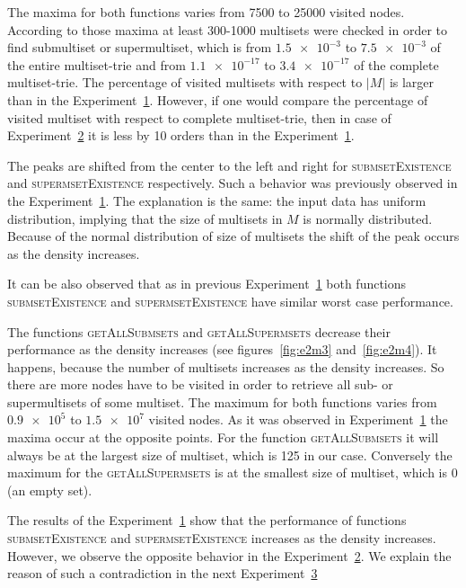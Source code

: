 The maxima for both functions varies from 7500 to 25000 visited nodes. According 
to those maxima at least 300-1000 multisets were checked in order to find 
submultiset or supermultiset, which is from $\num{1.5e-3}$ to $\num{7.5e-3}$ of the entire 
multiset-trie and from $\num{1.1e-17}$ to $\num{3.4e-17}$ of the complete 
multiset-trie. The percentage of visited multisets with respect to $|M|$ is 
larger than in the Experiment~\hyperref[s:exp1]{1}. However, if one would compare 
the percentage of visited multiset with respect to complete multiset-trie, then 
in case of Experiment~\hyperref[s:exp2]{2} it is less by 10 orders than in the 
Experiment~\hyperref[s:exp1]{1}.

The peaks are shifted from the center to the left and right for 
\textsc{submsetExistence} and \textsc{supermsetExistence} respectively. Such a 
behavior was previously observed in the Experiment~\hyperref[s:exp1]{1}. The 
explanation is the same: the input data has uniform distribution, implying that 
the size of multisets in $M$ is normally distributed. Because of the normal 
distribution of size of multisets the shift of the peak occurs as the density increases.

It can be also observed that as in previous Experiment~\hyperref[s:exp1]{1} both 
functions \textsc{submsetExistence} and \textsc{supermsetExistence} have similar 
worst case performance. 

The functions \textsc{getAllSubmsets} and \textsc{getAllSupermsets} decrease 
their performance as the density increases (see figures~\ref{fig:e2m3} 
and~\ref{fig:e2m4}). It happens, because the number of multisets increases as 
the density increases. So there are more nodes have to be visited in order to 
retrieve all sub- or supermultisets of some multiset. The maximum for both functions 
varies from $\num{0.9e5}$ to $\num{1.5e7}$ visited nodes. As it was observed in 
Experiment~\hyperref[s:exp1]{1} the maxima occur at the opposite points. For the 
function \textsc{getAllSubmsets} it will always be at the largest size of multiset, 
which is 125 in our case. Conversely the maximum for the \textsc{getAllSupermsets} 
is at the smallest size of multiset, which is 0 (an empty set).

The results of the Experiment~\hyperref[s:exp1]{1} show that the performance 
of functions \textsc{submsetExistence} and \textsc{supermsetExistence} increases 
as the density increases. However, we observe the opposite behavior in the 
Experiment~\hyperref[s:exp2]{2}. We explain the reason of such a contradiction 
in the next Experiment~\hyperref[s:exp3]{3} 



